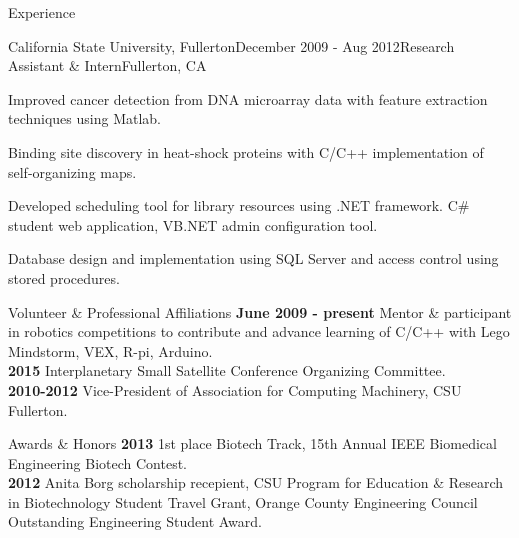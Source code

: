 \documentclass{resume} %
\begin{document}
\begin{rSection}{Experience}
\begin{rSubsection}{California State University, Fullerton}{December 2009 - Aug 2012}{Research Assistant \& Intern}{Fullerton, CA}
\item Improved cancer detection from DNA microarray data with feature extraction techniques using Matlab.
\item Binding site discovery in heat-shock proteins with C/C++ implementation of self-organizing maps.
\item Developed scheduling tool for library resources using .NET framework. C\# student web application, VB.NET admin configuration tool.
\item Database design and implementation using SQL Server and access control using stored procedures.
\end{rSubsection}

\end{rSection}


\begin{rSection}{Volunteer \& Professional Affiliations}
{\bf June 2009 - present}  Mentor \& participant in robotics competitions to contribute and advance learning of C/C++ with Lego Mindstorm, VEX, R-pi, Arduino.  \\
{\bf 2015 } Interplanetary Small Satellite Conference Organizing Committee. \\
{\bf 2010-2012} Vice-President of Association for Computing Machinery, CSU Fullerton. 
\end{rSection}




\begin{rSection}{Awards \& Honors}
{\bf 2013}  1st place Biotech Track, 15th Annual IEEE Biomedical Engineering Biotech Contest. \\
{\bf 2012} Anita Borg scholarship recepient, CSU Program for Education \& Research in Biotechnology Student Travel Grant, Orange County Engineering Council Outstanding Engineering Student Award. \\
\end{rSection}
\end{document}
